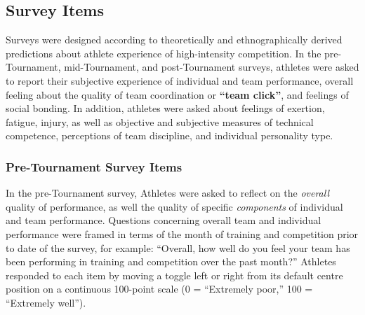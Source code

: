 \subsection{Survey Items}
Surveys were designed according to theoretically and ethnographically derived predictions about athlete experience of high-intensity competition.  In the pre-Tournament, mid-Tournament, and post-Tournament surveys, athletes were asked to report their subjective experience of individual and team performance, overall feeling about the quality of team coordination or \textbf{``team click''}, and feelings of social bonding.  In addition, athletes were asked about feelings of exertion, fatigue, injury, as well as objective and subjective measures of technical competence, perceptions of team discipline, and individual personality type.




  \subsubsection{Pre-Tournament Survey Items}


In the pre-Tournament survey, Athletes were asked to reflect on the \textit{overall} quality of performance, as well the quality of specific \textit{components} of individual and team performance.  Questions concerning overall team and individual performance were framed in terms of the month of training and competition prior to date of the survey, for example: ``Overall, how well do you feel your team has been performing in training and competition over the past month?''
Athletes responded to each item by moving a toggle left or right from its default centre position on a continuous 100-point scale (0 = ``Extremely poor,'' 100 = ``Extremely well'').

